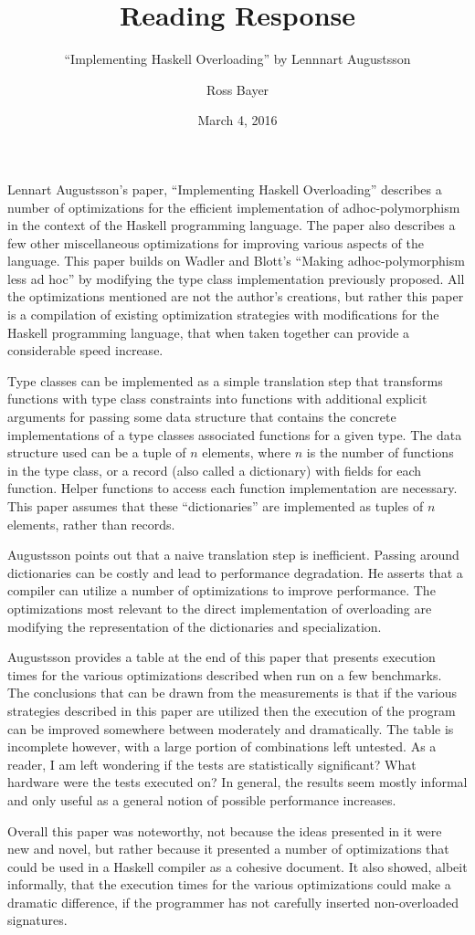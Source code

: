 \documentclass[a4paper,fleqn,notitlepage]{scrartcl}
\title{Reading Response}
\subtitle{\normalfont ``Implementing Haskell Overloading'' by Lennnart Augustsson}
\author{Ross Bayer}
\date{March 4, 2016}
\begin{document}
\maketitle


Lennart Augustsson's paper, ``Implementing Haskell Overloading'' describes a
number of optimizations for the efficient implementation of adhoc-polymorphism
in the context of the Haskell programming language. The paper also describes a 
few other miscellaneous optimizations for improving various aspects of the
language. This paper builds on Wadler and Blott's ``Making adhoc-polymorphism
less ad hoc'' by modifying the type class implementation previously proposed.
All the optimizations mentioned are not the author's creations, but rather
this paper is a compilation of existing optimization strategies with
modifications for the Haskell programming language, that when taken together
can provide a considerable speed increase.

Type classes can be implemented as a simple translation step that transforms
functions with type class constraints into functions with additional explicit
arguments for passing some data structure that contains the concrete
implementations of a type classes associated functions for a given type.
The data structure used can be a tuple of $n$ elements, where $n$ is the number
of functions in the type class, or a record (also called a dictionary) with
fields for each function. Helper functions to access each function implementation
are necessary. This paper assumes that these ``dictionaries'' are implemented as
tuples of $n$ elements, rather than records.

Augustsson points out that a naive translation step is inefficient. Passing around
dictionaries can be costly and lead to performance degradation. He asserts that
a compiler can utilize a number of optimizations to improve performance. The
optimizations most relevant to the direct implementation of overloading are
modifying the representation of the dictionaries and specialization.

Augustsson provides a table at the end of this paper that presents execution
times for the various optimizations described when run on a few benchmarks.
The conclusions that can be drawn from the measurements is that if the various
strategies described in this paper are utilized then the execution of the
program can be improved somewhere between moderately and dramatically. The table
is incomplete however, with a large portion of combinations left untested.
As a reader, I am left wondering if the tests are statistically significant?
What hardware were the tests executed on? In general, the results seem mostly
informal and only useful as a general notion of possible performance increases.

Overall this paper was noteworthy, not because the ideas presented in it were
new and novel, but rather because it presented a number of optimizations that
could be used in a Haskell compiler as a cohesive document. It also showed,
albeit informally, that the execution times for the various optimizations
could make a dramatic difference, if the programmer has not carefully inserted
non-overloaded signatures.
\end{document}
